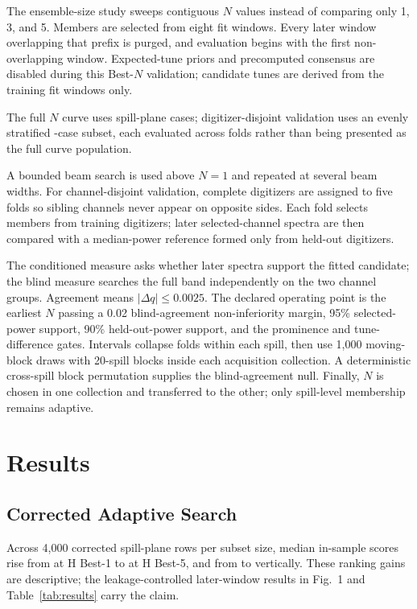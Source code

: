 \documentclass[]{jacow}
\begin{document}
The ensemble-size study sweeps contiguous $N$ values instead of comparing only 1, 3, and 5. Members are selected from eight fit windows. Every later window overlapping that prefix is purged, and evaluation begins with the first non-overlapping window. Expected-tune priors and precomputed consensus are disabled during this Best-$N$ validation; candidate tunes are derived from the training fit windows only.

The full $N$ curve uses \BestNCurveSpillPlaneCount{} spill-plane cases; digitizer-disjoint validation uses an evenly stratified \BestNValidationSpillPlaneCount{}-case subset, each evaluated across \BestNDigitizerFoldCount{} folds rather than being presented as the full curve population.

A bounded beam search is used above $N=1$ and repeated at several beam widths. For channel-disjoint validation, complete digitizers are assigned to five folds so sibling channels never appear on opposite sides. Each fold selects members from training digitizers; later selected-channel spectra are then compared with a median-power reference formed only from held-out digitizers.

The conditioned measure asks whether later spectra support the fitted candidate; the blind measure searches the full band independently on the two channel groups. Agreement means $|\Delta q|\leq0.0025$. The declared operating point is the earliest $N$ passing a 0.02 blind-agreement non-inferiority margin, 95\% selected-power support, 90\% held-out-power support, and the prominence and tune-difference gates. Intervals collapse folds within each spill, then use 1,000 moving-block draws with 20-spill blocks inside each acquisition collection. A deterministic cross-spill block permutation supplies the blind-agreement null. Finally, $N$ is chosen in one collection and transferred to the other; only spill-level membership remains adaptive.

\section{Results}

\subsection{Corrected Adaptive Search}

Across 4,000 corrected spill-plane rows per subset size, median in-sample scores rise from \PrimaryHBestOneScore{} at H Best-1 to \PrimaryHBestFiveScore{} at H Best-5, and from \PrimaryVBestOneScore{} to \PrimaryVBestFiveScore{} vertically. These ranking gains are descriptive; the leakage-controlled later-window results in Fig.~1 and Table~\ref{tab:results} carry the claim.
\end{document}
